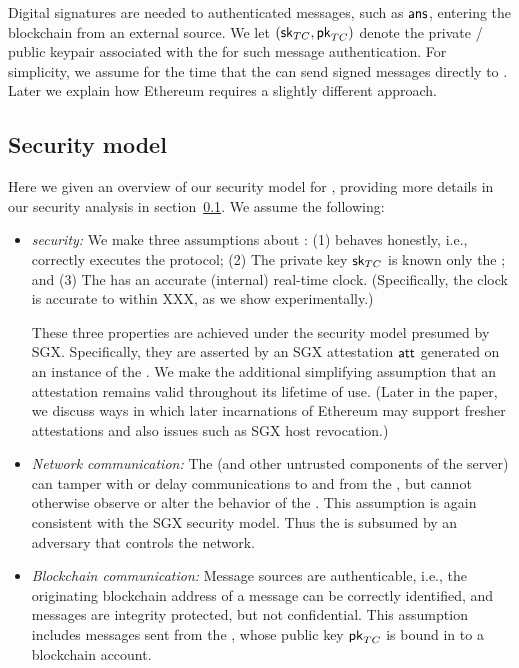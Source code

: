 Digital signatures are needed to authenticated messages, such as ${\sf ans}$, entering the blockchain from an external source. We let $({{\sf sk}_{TC}}, {\sf pk}_{TC})$ denote the private / public keypair associated with the \encname for such message authentication. For simplicity, we assume for the time that the \encname can send signed messages directly to \tcont. Later we explain how Ethereum requires a slightly different approach.

\subsection{Security model}

Here we given an overview of our security model for \tc, providing more details in our security analysis in section~\ref{}. We assume the following:

\begin{itemize}
\item {\em \encname security:} We make three assumptions about \encname : (1) \encname behaves honestly, i.e., correctly executes the \tc protocol; (2) The private key ${{\sf sk}_{TC}}$ is known only the \encname; and (3) The \encname has an accurate (internal) real-time clock. (Specifically, the clock is accurate to within XXX, as we show experimentally.)

These three properties are achieved under the security model presumed by SGX. Specifically, they are asserted by an SGX attestation ${\sf att}$ generated on an instance of the \encname. We make the additional simplifying assumption that an attestation remains valid throughout its lifetime of use. (Later in the paper, we discuss ways in which later incarnations of Ethereum may support fresher attestations and also issues such as SGX host revocation.)

\item {\em Network communication:} The \medname (and other untrusted components of the \tc server) can tamper with or delay communications to and from the \encname, but cannot otherwise observe or alter the behavior of the \encname. This assumption is again consistent with the SGX security model. Thus the \medname is subsumed by an adversary that controls the network. 

\item {\em Blockchain communication:} Message sources are authenticable, i.e., the originating blockchain address of a message can be correctly identified, and messages are integrity protected, but not confidential. This assumption includes messages sent from the \encname, whose public key ${\sf pk}_{TC}$ is bound in \tc to a blockchain account. 
\end{itemize}












